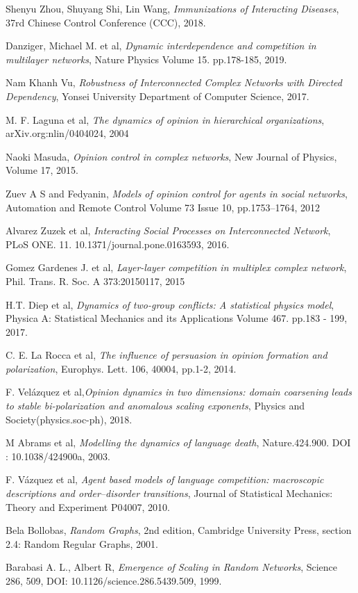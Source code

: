 \documentclass[english]{cccconf}
\begin{document}
\begin{thebibliography}{0}
Shenyu Zhou,  Shuyang Shi, Lin Wang, \textit{Immunizations of Interacting Diseases}, 37rd Chinese Control Conference (CCC), 2018.

Danziger, Michael M. et al, \textit{Dynamic interdependence and competition in multilayer networks}, Nature Physics Volume 15. pp.178-185, 2019.

Nam Khanh Vu, \textit{Robustness of Interconnected Complex Networks with Directed Dependency}, Yonsei University Department of Computer Science, 2017.

M. F. Laguna et al, \textit{The dynamics of opinion in hierarchical organizations}, arXiv.org:nlin/0404024, 2004 

Naoki Masuda, \textit{Opinion control in complex networks}, New Journal of Physics, Volume 17, 2015.

Zuev A S and Fedyanin, 
\textit{Models of opinion control for agents in social networks}, Automation and Remote Control Volume 73 Issue 10, pp.1753–1764, 2012 

Alvarez Zuzek et al, \textit{Interacting Social Processes on Interconnected Network}, PLoS ONE. 11. 10.1371/journal.pone.0163593, 2016.

Gomez Gardenes J. et al, \textit{Layer-layer competition in multiplex complex network}, Phil. Trans. R. Soc. A 373:20150117, 2015

H.T. Diep et al, \textit{Dynamics of two-group conflicts: A statistical physics model}, Physica A: Statistical Mechanics and its Applications Volume 467. pp.183 - 199, 2017.

C. E. La Rocca et al, \textit{The influence of persuasion in opinion formation and polarization}, Europhys. Lett. 106, 40004, pp.1-2, 2014.

F. Vel{\'a}zquez et al,\textit{Opinion dynamics in two dimensions: domain coarsening leads to stable bi-polarization and anomalous scaling exponents}, Physics and Society(physics.soc-ph), 2018. 

M Abrams et al, \textit{Modelling the dynamics of language death}, Nature.424.900. DOI : 10.1038/424900a, 2003.

 F. V{\'a}zquez et al, \textit{Agent based models of language competition: macroscopic descriptions and order–disorder transitions}, Journal of Statistical Mechanics: Theory and Experiment P04007, 2010.

 Bela Bollobas, \textit{Random Graphs}, 2nd edition, Cambridge University Press, section 2.4: Random Regular Graphs, 2001.

Barabasi A. L., Albert R, \textit{Emergence of Scaling in Random Networks}, Science 286, 509, DOI: 10.1126/science.286.5439.509, 1999.

\end{thebibliography}
\end{document}
